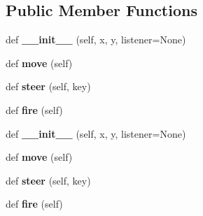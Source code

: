\subsection*{Public Member Functions}
\begin{DoxyCompactItemize}
\item 
def {\bfseries \+\_\+\+\_\+init\+\_\+\+\_\+} (self, x, y, listener=None)\hypertarget{classSpaceship_1_1Spaceship_a0ce8d5216e02a15f018cdb852a702a00}{}\label{classSpaceship_1_1Spaceship_a0ce8d5216e02a15f018cdb852a702a00}

\item 
def {\bfseries move} (self)\hypertarget{classSpaceship_1_1Spaceship_a9ed1701b8506b3287a3c0f376965eaa3}{}\label{classSpaceship_1_1Spaceship_a9ed1701b8506b3287a3c0f376965eaa3}

\item 
def {\bfseries steer} (self, key)\hypertarget{classSpaceship_1_1Spaceship_aaad85580a083d4fbb6c839f98224a6c5}{}\label{classSpaceship_1_1Spaceship_aaad85580a083d4fbb6c839f98224a6c5}

\item 
def {\bfseries fire} (self)\hypertarget{classSpaceship_1_1Spaceship_a7cf6faeb7488ab1a77fc5668076c1f35}{}\label{classSpaceship_1_1Spaceship_a7cf6faeb7488ab1a77fc5668076c1f35}

\item 
def {\bfseries \+\_\+\+\_\+init\+\_\+\+\_\+} (self, x, y, listener=None)\hypertarget{classSpaceship_1_1Spaceship_a0ce8d5216e02a15f018cdb852a702a00}{}\label{classSpaceship_1_1Spaceship_a0ce8d5216e02a15f018cdb852a702a00}

\item 
def {\bfseries move} (self)\hypertarget{classSpaceship_1_1Spaceship_a9ed1701b8506b3287a3c0f376965eaa3}{}\label{classSpaceship_1_1Spaceship_a9ed1701b8506b3287a3c0f376965eaa3}

\item 
def {\bfseries steer} (self, key)\hypertarget{classSpaceship_1_1Spaceship_aaad85580a083d4fbb6c839f98224a6c5}{}\label{classSpaceship_1_1Spaceship_aaad85580a083d4fbb6c839f98224a6c5}

\item 
def {\bfseries fire} (self)\hypertarget{classSpaceship_1_1Spaceship_a7cf6faeb7488ab1a77fc5668076c1f35}{}\label{classSpaceship_1_1Spaceship_a7cf6faeb7488ab1a77fc5668076c1f35}

\end{DoxyCompactItemize}
